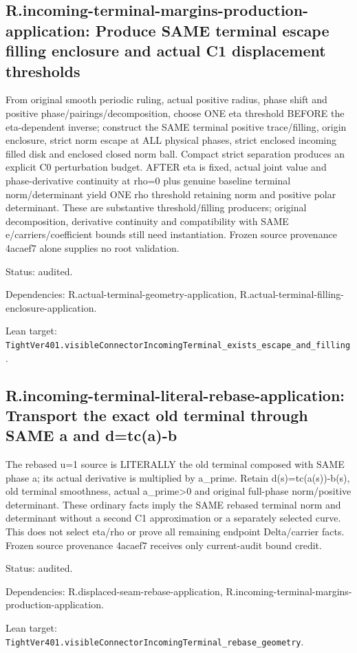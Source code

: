 \documentclass{article}
\begin{document}
\subsection*{R.incoming-terminal-margins-production-application: Produce SAME terminal escape filling enclosure and actual C1 displacement thresholds}
From original smooth periodic ruling, actual positive radius, phase shift and positive phase/pairings/decomposition, choose ONE eta threshold BEFORE the eta-dependent inverse; construct the SAME terminal positive trace/filling, origin enclosure, strict norm escape at ALL physical phases, strict enclosed incoming filled disk and enclosed closed norm ball. Compact strict separation produces an explicit C0 perturbation budget. AFTER eta is fixed, actual joint value and phase-derivative continuity at rho=0 plus genuine baseline terminal norm/determinant yield ONE rho threshold retaining norm and positive polar determinant. These are substantive threshold/filling producers; original decomposition, derivative continuity and compatibility with SAME e/carriers/coefficient bounds still need instantiation. Frozen source provenance 4acaef7 alone supplies no root validation.
\par Status: audited.
\par Dependencies: R.actual-terminal-geometry-application, R.actual-terminal-filling-enclosure-application.
\par Lean target: \texttt{TightVer401.visibleConnectorIncomingTerminal\_exists\_escape\_and\_filling}.
\subsection*{R.incoming-terminal-literal-rebase-application: Transport the exact old terminal through SAME a and d=tc(a)-b}
The rebased u=1 source is LITERALLY the old terminal composed with SAME phase a; its actual derivative is multiplied by a\_prime. Retain d(s)=tc(a(s))-b(s), old terminal smoothness, actual a\_prime>0 and original full-phase norm/positive determinant. These ordinary facts imply the SAME rebased terminal norm and determinant without a second C1 approximation or a separately selected curve. This does not select eta/rho or prove all remaining endpoint Delta/carrier facts. Frozen source provenance 4acaef7 receives only current-audit bound credit.
\par Status: audited.
\par Dependencies: R.displaced-seam-rebase-application, R.incoming-terminal-margins-production-application.
\par Lean target: \texttt{TightVer401.visibleConnectorIncomingTerminal\_rebase\_geometry}.
\end{document}
